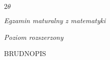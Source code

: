 \documentclass[a4paper,12pt]{article}
\begin{document}
$ 2\theta$

{\it Egzamin maturalny z matematyki}

{\it Poziom rozszerzony}

BRUDNOPIS
\end{document}

